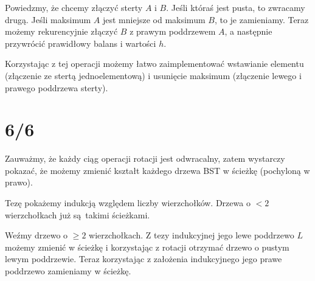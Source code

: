 \documentclass[a4paper, 12pt]{article}
\newcommand{\+}{\enspace}
\begin{document}
Powiedzmy, że chcemy złączyć sterty $A$ i $B$.
Jeśli któraś jest pusta, to zwracamy drugą.
Jeśli maksimum  $A$ jest mniejsze od maksimum $B$, to je zamieniamy.
Teraz możemy rekurencyjnie złączyć $B$ z prawym poddrzewem $A$,
a następnie przywrócić prawidłowy balans i wartości $h$.

Korzystając z tej operacji możemy łatwo zaimplementować
wstawianie elementu (złączenie ze stertą jednoelementową) i
usunięcie maksimum (złączenie lewego i prawego poddrzewa sterty).

\section*{6/6}
Zauważmy, że każdy ciąg operacji rotacji jest odwracalny,
zatem wystarczy pokazać, że możemy zmienić kształt każdego drzewa BST
w ścieżkę (pochyloną w prawo).

Tezę pokażemy indukcją względem liczby wierzchołków.
Drzewa o $<2$ wierzchołkach już są takimi ścieżkami.

Weźmy drzewo o $≥2$ wierzchołkach.
Z tezy indukcyjnej jego lewe poddrzewo $L$ możemy
zmienić w ścieżkę i korzystając z rotacji otrzymać drzewo o pustym lewym
poddrzewie.
Teraz korzystając z założenia indukcyjnego jego prawe poddrzewo zamieniamy
w ścieżkę.
\end{document}
